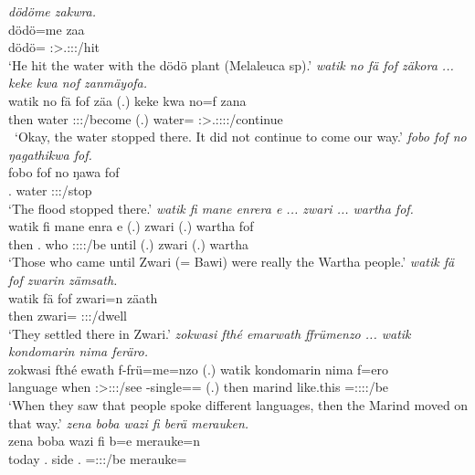 \begin{exe}
	\emph{dödöme zakwra.}\\
	\gll dödö=me zaa\\ 
	dödö={\Ins} \Sg:\Sbj>\Tsg.\F:\Obj:\Pst:\Pfv/hit\\
	\trans `He hit the water with the dödö plant (Melaleuca sp).'
	\emph{watik no fä fof zäkora ... keke kwa nof zanmäyofa.}\\
	\gll watik no fä fof zäa (.) keke kwa no=f zana\\ 
	then water {\Dist} {\Emph} \Sg:\Sbj:\Pst:\Ipfv/become (.) {\Neg} {\Fut} water={\Erg} \Sg:\Sbj>\Tsg.\F:\Obj:\Pst:\Pfv:\Venit/continue\\\
	\trans `Okay, the water stopped there. It did not continue to come our way.'
\exi{73} 
	\emph{fobo fof no ŋagathikwa fof.}\\
	\gll fobo fof no ŋawa fof\\ 
	\Dist.{\All} {\Emph} water \Sg:\Sbj:\Pst:\Ipfv/stop \Emph\\
	\trans `The flood stopped there.'
	\emph{watik fi mane enrera e ... zwari ... wartha fof.}\\
	\gll watik fi mane enra e (.) zwari (.) wartha fof\\ 
	then \Third.{\Abs} who \Sg:\Sbj:\Pst:\Ipfv:\Venit/be until (.) zwari (.) wartha {\Emph}\\
	\trans `Those who came until Zwari (= Bawi) were really the Wartha people.'
\exi{75} 
	\emph{watik fä fof zwarin zämsath.}\\
	\gll watik fä fof zwari=n zäath\\ 
	then {\Dist} {\Emph} zwari={\Loc} \Stpl:\Sbj:\Pst:\Pfv/dwell\\
	\trans `They settled there in Zwari.'
	\emph{zokwasi fthé emarwath ffrümenzo ... watik kondomarin nima feräro.}\\
	\gll zokwasi fthé e\stem{mar}wath f-frü=me=nzo (.) watik kondomarin nima f=ero\\ 
	language when \Stpl:\Sbj>\Stpl:\Obj:\Pst:\Ipfv/see \Redup-single=\Ins={\Only} (.) then marind like.this \Dist=\Stpl:\Sbj:\Pst:\Ipfv:\Andat/be\\
	\trans `When they saw that people spoke different languages, then the Marind moved on that way.' 	
\exi{77} 
	\emph{zena boba wazi fi berä merauken.}\\
	\gll zena boba wazi fi b=e merauke=n\\ 
	today \Med.{\Abl} side \Third.{\Abs} \Med=\Stpl:\Sbj:\Nonpast:\Ipfv/be merauke=\Loc\\

\end{exe}
